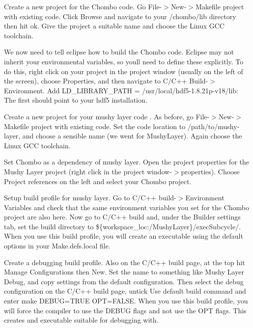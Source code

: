 \begin{DoxyEnumerate}
\item Create a new project for the Chombo code. Go File-\/$>$New-\/$>$Makefile project with existing code. Click Browse and navigate to your /chombo/lib directory then hit ok. Give the project a suitable name and choose the Linux G\+CC toolchain.
\item We now need to tell eclipse how to build the Chombo code. Eclipse may not inherit your environmental variables, so you\textquotesingle{}ll need to define these explicitly. To do this, right click on your project in the project window (usually on the left of the screen), choose Properties, and then navigate to C/\+C++ Build-\/$>$Environment. Add {\ttfamily L\+D\+\_\+\+L\+I\+B\+R\+A\+R\+Y\+\_\+\+P\+A\+TH = /usr/local/hdf5-\/1.8.\+21p-\/v18/lib\+:} The first should point to your hdf5 installation.
\item Create a new project for your mushy layer code . As before, go File-\/$>$New-\/$>$Makefile project with existing code. Set the code location to {\ttfamily /path/to/mushy-\/layer}, and choose a sensible name (we went for \textquotesingle{}Mushy\+Layer\textquotesingle{}). Again choose the Linux G\+CC toolchain.
\item Set Chombo as a dependency of mushy layer. Open the project properties for the Mushy Layer project (right click in the project window-\/$>$properties). Choose \textquotesingle{}Project references\textquotesingle{} on the left and select your Chombo project.
\item Setup build profile for mushy layer. Go to C/\+C++ build-\/$>$Environment Variables and check that the same environment variables you set for the Chombo project are also here. Now go to C/\+C++ build and, under the Builder settings tab, set the build directory to {\ttfamily \$\{workspace\+\_\+loc\+:/\+Mushy\+Layer\}/exec\+Subcycle/}. When you use this build profile, you will create an executable using the default options in your Make.\+defs.\+local file.
\item Create a debugging build profile. Also on the C/\+C++ build page, at the top hit \textquotesingle{}Manage Configurations\textquotesingle{} then \textquotesingle{}New\textquotesingle{}. Set the name to something like \textquotesingle{}Mushy Layer Debug\textquotesingle{}, and copy settings from the default configuration. Then select the debug configuration on the C/\+C++ build page, untick \textquotesingle{}Use default build command\textquotesingle{} and enter {\ttfamily make D\+E\+B\+UG=T\+R\+UE O\+PT=F\+A\+L\+SE}. When you use this build profile, you will force the compiler to use the D\+E\+B\+UG flags and not use the O\+PT flags. This creates and executable suitable for debugging with.

\end{DoxyEnumerate}
